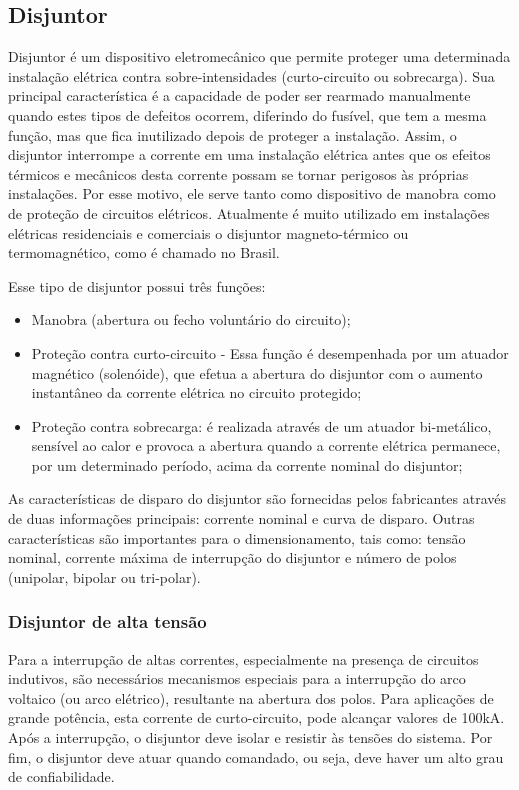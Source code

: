 \documentclass[a5paper]{ufsc-thesis}
\begin{document}
\subsection{Disjuntor}
Disjuntor é um dispositivo eletromecânico que permite proteger uma determinada instalação elétrica contra sobre-intensidades (curto-circuito ou sobrecarga). Sua principal característica é a capacidade de poder ser rearmado manualmente quando estes tipos de defeitos ocorrem, diferindo do fusível, que tem a mesma função, mas que fica inutilizado depois de proteger a instalação. Assim, o disjuntor interrompe a corrente em uma instalação elétrica antes que os efeitos térmicos e mecânicos desta corrente possam se tornar perigosos às próprias instalações. Por esse motivo, ele serve tanto como dispositivo de manobra como de proteção de circuitos elétricos. Atualmente é muito utilizado em instalações elétricas residenciais e comerciais o disjuntor magneto-térmico ou termomagnético, como é chamado no Brasil.\par
Esse tipo de disjuntor possui três funções:
\begin{itemize}
\item Manobra (abertura ou fecho voluntário do circuito);
\item Proteção contra curto-circuito - Essa função é desempenhada por um atuador magnético (solenóide), que efetua a abertura do disjuntor com o aumento instantâneo da corrente elétrica no circuito protegido;
\item Proteção contra sobrecarga: é realizada através de um atuador bi-metálico, sensível ao calor e provoca a abertura quando a corrente elétrica permanece, por um determinado período, acima da corrente nominal do disjuntor; 
\end{itemize}\par
As características de disparo do disjuntor são fornecidas pelos fabricantes através de duas informações principais: corrente nominal e curva de disparo. Outras características são importantes para o dimensionamento, tais como: tensão nominal, corrente máxima de interrupção do disjuntor e número de polos (unipolar, bipolar ou tri-polar).\par

\subsubsection{Disjuntor de alta tensão}
Para a interrupção de altas correntes, especialmente na presença de circuitos indutivos, são necessários mecanismos especiais para a interrupção do arco voltaico (ou arco elétrico), resultante na abertura dos polos. Para aplicações de grande potência, esta corrente de curto-circuito, pode alcançar valores de 100kA. Após a interrupção, o disjuntor deve isolar e resistir às tensões do sistema. Por fim, o disjuntor deve atuar quando comandado, ou seja, deve haver um alto grau de confiabilidade.\par
\end{document}
